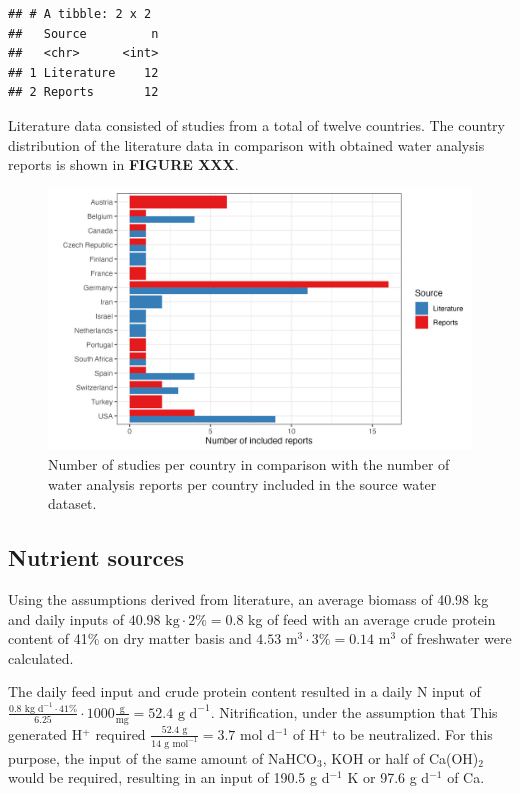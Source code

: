 \documentclass[
]{article}
\begin{document}
\begin{verbatim}
## # A tibble: 2 x 2
##   Source         n
##   <chr>      <int>
## 1 Literature    12
## 2 Reports       12
\end{verbatim}

Literature data consisted of studies from a total of twelve countries. The country distribution of the literature data in comparison with obtained water analysis reports is shown in \textbf{FIGURE XXX}.

\begin{figure}
\centering
\includegraphics{plots/contribution_waterData_countryPlot.png}
\caption{Number of studies per country in comparison with the number of water analysis reports per country included in the source water dataset.}
\end{figure}

\hypertarget{nutrient-sources}{%
\subsection{Nutrient sources}\label{nutrient-sources}}

Using the assumptions derived from literature, an average biomass of 40.98 kg and daily inputs of \(40.98 \text{ kg} \cdot 2\% = 0.8\) kg of feed with an average crude protein content of 41\% on dry matter basis and \(4.53 \text{ m}^{3} \cdot 3\% = 0.14 \text{ m}^{3}\) of freshwater were calculated.

The daily feed input and crude protein content resulted in a daily N input of \(\frac{0.8 \text{ kg d}^{-1} \cdot 41\%}{6.25} \cdot 1000 \frac{\text{g}}{\text{mg}} = 52.4 \text{ g d}^{-1}\).
Nitrification, under the assumption that This generated H\(^{+}\) required \(\frac{52.4 \text{ g}}{14 \text{ g mol}^{-1}} = 3.7\) mol d\(^{-1}\) of H\(^{+}\) to be neutralized. For this purpose, the input of the same amount of \(\text{NaHCO}_{3}\), KOH or half of Ca(OH)\(_{2}\) would be required, resulting in an input of 190.5 g d\(^{-1}\) K or 97.6 g d\(^{-1}\) of Ca.
\end{document}
